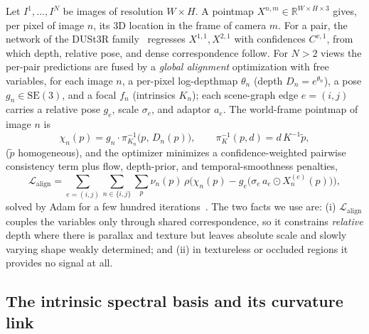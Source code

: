\documentclass{article}
\newcommand{\R}{\mathbb{R}}
\newcommand{\SE}{\mathrm{SE}}          %
\begin{document}
Let $I^1,\dots,I^N$ be images of resolution $W\times H$. A pointmap
$X^{n,m}\in\R^{W\times H\times 3}$ gives, per pixel of image $n$, its 3D
location in the frame of camera $m$. For a pair, the network of the DUSt3R
family~\cite{wang2024dust3r,zhang2025monst3r,han2026enhancing} regresses $X^{1,1},X^{2,1}$ with
confidences $C^{v,1}$, from which depth, relative pose, and dense
correspondence follow. For $N>2$ views the per-pair predictions are fused by a
\emph{global alignment} optimization with free variables, for each image $n$, a
per-pixel log-depthmap $\theta_n$ (depth $D_n=e^{\theta_n}$), a pose
$g_n\in\SE(3)$, and a focal $f_n$ (intrinsics $K_n$); each scene-graph edge
$e=(i,j)$ carries a relative pose $g_e$, scale $\sigma_e$, and adaptor $a_e$.
The world-frame pointmap of image $n$ is
\begin{equation}
\chi_n(p)=g_n\cdot\pi^{-1}_{K_n}\!\big(p,\,D_n(p)\big),\qquad
\pi^{-1}_{K}(p,d)=d\,K^{-1}\tilde p,
\label{eq:chi}
\end{equation}
($\tilde p$ homogeneous), and the optimizer minimizes a confidence-weighted
pairwise consistency term plus flow, depth-prior, and temporal-smoothness
penalties,
\begin{equation}
\mathcal L_{\mathrm{align}}
=\!\!\sum_{e=(i,j)}\sum_{n\in\{i,j\}}\sum_p
\nu_n(p)\,\rho\!\Big(\chi_n(p)-g_e\big(\sigma_e\,a_e\!\odot\! X^{(e)}_n(p)\big)\Big),
\label{eq:align}
\end{equation}
solved by Adam for a few hundred iterations~\cite{zhang2025monst3r}. The two facts we
use are: (i) $\mathcal L_{\mathrm{align}}$ couples the variables only through
shared correspondence, so it constrains \emph{relative} depth where there is
parallax and texture but leaves absolute scale and slowly varying shape weakly
determined; and (ii) in textureless or occluded regions it provides no signal
at all.

\subsection{The intrinsic spectral basis and its curvature link}
\end{document}
